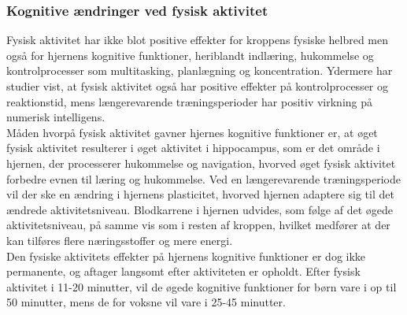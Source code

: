 \subsubsection{Kognitive ændringer ved fysisk aktivitet}

Fysisk aktivitet har ikke blot positive effekter for kroppens fysiske helbred men også for hjernens kognitive funktioner, heriblandt indlæring, hukommelse og kontrolprocesser som multitasking, planlægning og koncentration\citep{Berchtold2010,Schmidt2015}. Ydermere har studier vist, at fysisk aktivitet også har positive effekter på kontrolprocesser og reaktionstid, mens længerevarende træningsperioder har positiv virkning på numerisk intelligens\citep{Bugge2015,Berchtold2010,Schmidt2015}.\\
Måden hvorpå fysisk aktivitet gavner hjernes kognitive funktioner er, at øget fysisk aktivitet resulterer i øget aktivitet i hippocampus, som er det område i hjernen, der processerer hukommelse og navigation, hvorved øget fysisk aktivitet forbedre evnen til læring og hukommelse. Ved en længerevarende træningsperiode vil der ske en ændring i hjernens plasticitet, hvorved hjernen adaptere sig til det ændrede aktivitetsniveau. Blodkarrene i hjernen udvides, som følge af det øgede aktivitetsniveau, på samme vis som i resten af kroppen, hvilket medfører at der kan tilføres flere næringsstoffer og mere energi.\citep{Cotman2007}\\
Den fysiske aktivitets effekter på hjernens kognitive funktioner er dog ikke permanente, og aftager langsomt efter aktiviteten er opholdt. Efter fysisk aktivitet i 11-20 minutter, vil de øgede kognitive funktioner for børn vare i op til 50 minutter, mens de for voksne vil vare i 25-45 minutter.\citep{Cotman2007}




